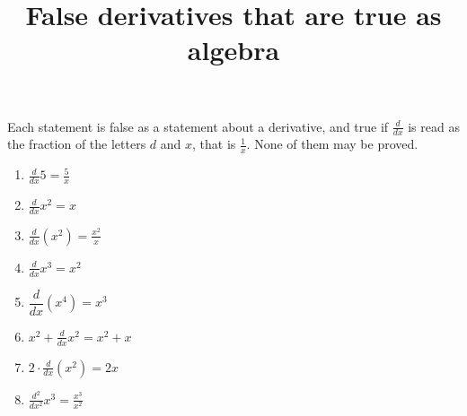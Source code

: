 \documentclass[11pt,a4paper]{article}
\title{False derivatives that are true as algebra}
\author{}
\date{}
\begin{document}
\maketitle
Each statement is false as a statement about a derivative, and true if $\frac{d}{dx}$ is read as the fraction of the letters $d$ and $x$, that is $\frac{1}{x}$. None of them may be proved.

\begin{enumerate}
\item $\displaystyle \frac{d}{dx} 5 = \frac{5}{x}$
\item $\displaystyle \frac{d}{dx} x^{2} = x$
\item $\displaystyle \frac{d}{dx}\left( x^{2} \right) = \frac{x^{2}}{x}$
\item $\textstyle \frac{d}{dx} x^{3} = x^{2}$
\item $\displaystyle \dfrac{d}{dx}\left( x^{4} \right) = x^{3}$
\item $\displaystyle x^{2} + \frac{d}{dx} x^{2} = x^{2} + x$
\item $\displaystyle 2 \cdot \frac{d}{dx}\left( x^{2} \right) = 2x$
\item $\displaystyle \frac{d^{2}}{dx^{2}} x^{3} = \frac{x^{3}}{x^{2}}$
\end{enumerate}
\end{document}
